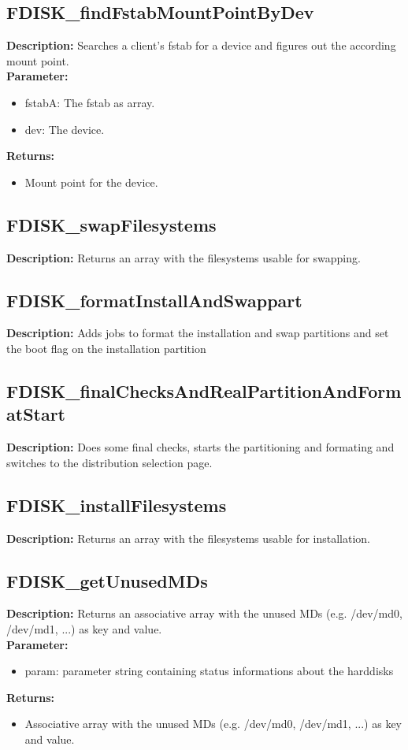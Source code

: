 \subsection{FDISK\_findFstabMountPointByDev}
\textbf{Description:} Searches a client's fstab for a device and figures out the according mount point.\\
\textbf{Parameter:}
\begin{itemize}
\item fstabA: The fstab as array.
\item dev: The device.
\end{itemize}
\textbf{Returns:}
\begin{itemize}
\item Mount point for the device.
\end{itemize}

\subsection{FDISK\_swapFilesystems}
\textbf{Description:} Returns an array with the filesystems usable for swapping.\\

\subsection{FDISK\_formatInstallAndSwappart}
\textbf{Description:} Adds jobs to format the installation and swap partitions and set the boot flag on the installation partition\\

\subsection{FDISK\_finalChecksAndRealPartitionAndFormatStart}
\textbf{Description:} Does some final checks, starts the partitioning and formating and switches to the distribution selection page.\\

\subsection{FDISK\_installFilesystems}
\textbf{Description:} Returns an array with the filesystems usable for installation.\\

\subsection{FDISK\_getUnusedMDs}
\textbf{Description:} Returns an associative array with the unused MDs (e.g. /dev/md0, /dev/md1, ...) as key and value.\\
\textbf{Parameter:}
\begin{itemize}
\item param: parameter string containing status informations about the harddisks
\end{itemize}
\textbf{Returns:}
\begin{itemize}
\item Associative array with the unused MDs (e.g. /dev/md0, /dev/md1, ...) as key and value.
\end{itemize}

